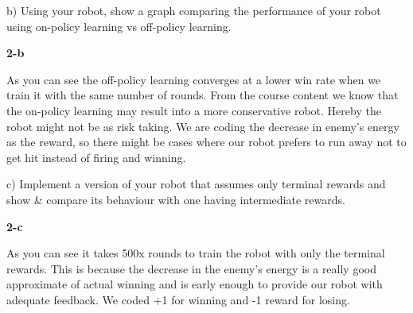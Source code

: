 \documentclass[a4paper,12pt]{article}
\begin{document}
\pagebreak
b) Using your robot, show a graph comparing the performance of your robot using on-policy learning vs off-policy learning.
\begin{center}
\textbf{2-b}
\end{center}
As you can see the off-policy learning converges at a lower win rate when we train it with the same number of rounds. From the course content we know that the on-policy learning may result into a more conservative robot. Hereby the robot might not be as risk taking. We are coding the decrease in enemy's energy as the reward, so there might be cases where our robot prefers to run away not to get hit instead of firing and winning. 


\pagebreak
c) Implement a version of your robot that assumes only terminal rewards and show \& compare its behaviour with one having intermediate rewards.
\begin{center}

\textbf{2-c}
\end{center}
As you can see it takes 500x rounds to train the robot with only the terminal rewards. This is because the decrease in the enemy's energy is a really good approximate of actual winning and is early enough to provide our robot with adequate feedback. We coded +1 for winning and -1 reward for losing. 
\end{document}
